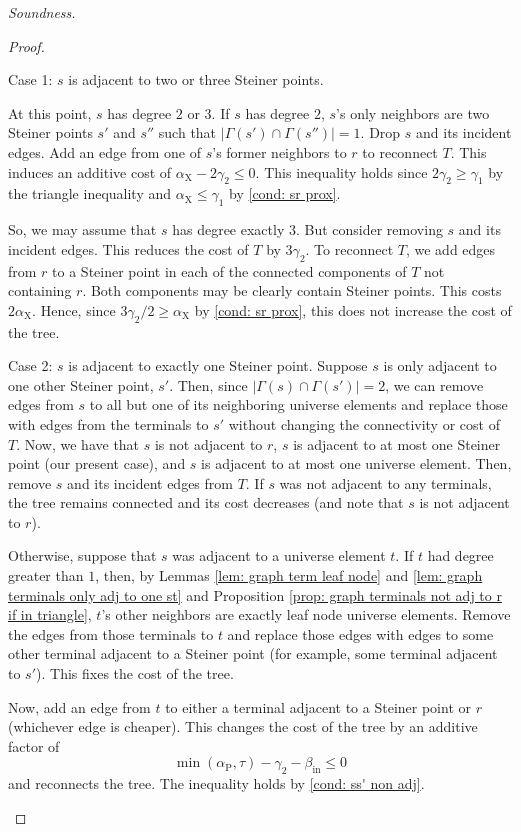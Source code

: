 \documentclass{theoretics}
\newcommand{\1}{\textbf{1}}
\newcommand{\td}{\tau}
\newcommand{\srd}{\alpha_{\text{X}}}
\newcommand{\trd}{\alpha_{\text{P}}}
\begin{document}
\begin{paragraph}{\textit{Soundness.}}
\begin{proof}
\begin{paragraph}{Case 1: $s$ is adjacent to two or three Steiner points.}
  
  At this point, $s$ has degree $2$ or $3$. If $s$ has degree $2$, $s$'s only neighbors are two Steiner points $s'$ and $s''$ such that $|\Gamma(s') \cap \Gamma(s'')| = 1$. Drop $s$ and its incident edges. Add an edge from one of $s$'s former neighbors to $r$ to reconnect $T$. This induces an additive cost of $\srd - 2\gamma_2 \leq 0$. This inequality holds since $2\gamma_2 \geq \gamma_1$ by the triangle inequality and $\srd \leq \gamma_1$ by \ref{cond: sr prox}.
  
  So, we may assume that $s$ has degree exactly $3$. But consider removing $s$ and its incident edges. This reduces the cost of $T$ by $3\gamma_2$. To reconnect $T$, we add edges from $r$ to a Steiner point in each of the connected components of $T$ not containing $r$. Both components may be clearly contain Steiner points. This costs $2\srd$. Hence, since $3\gamma_2/2 \geq \srd$ by \ref{cond: sr prox}, this does not increase the cost of the tree.
  \end{paragraph}
  
  \begin{paragraph}{Case 2: $s$ is adjacent to exactly one Steiner point.}
  Suppose $s$ is only adjacent to one other Steiner point, $s'$. Then, since $|\Gamma(s) \cap \Gamma(s')| = 2$, we can remove edges from $s$ to all but one of its neighboring universe elements and replace those with edges from the terminals to $s'$ without changing the connectivity or cost of $T$. Now, we have that $s$ is not adjacent to $r$, $s$ is adjacent to at most one Steiner point (our present case), and $s$ is adjacent to at most one universe element. Then, remove $s$ and its incident edges from $T$. If $s$ was not adjacent to any terminals, the tree remains connected and its cost decreases (and note that $s$ is not adjacent to $r$).
  
  Otherwise, suppose that $s$ was adjacent to a universe element $t$. If $t$ had degree greater than $1$, then, by Lemmas \ref{lem: graph term leaf node} and \ref{lem: graph terminals only adj to one st} and Proposition \ref{prop: graph terminals not adj to r if in triangle}, $t$'s other neighbors are exactly leaf node universe elements. Remove the edges from those terminals to $t$ and replace those edges with edges to some other terminal adjacent to a Steiner point (for example, some terminal adjacent to $s'$). This fixes the cost of the tree.
  
   Now, add an edge from $t$ to either a terminal adjacent to a Steiner point or $r$ (whichever edge is cheaper). This changes the cost of the tree by an additive factor of
  \[
  \min(\trd, \td) - \gamma_2 - \beta_{\text{in}} \leq 0
  \]
  and reconnects the tree. The inequality holds by \ref{cond: ss' non adj}.
  \end{paragraph}


\end{proof}
\end{paragraph}
\end{document}
